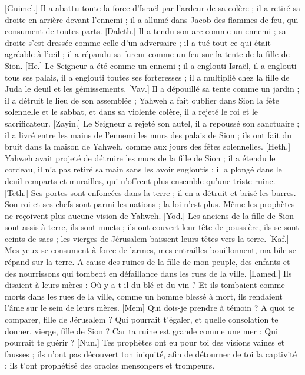 \begin{multicols}{2}
[Guimel.] Il a abattu toute la force d’Israël par l’ardeur de sa colère ; il a retiré sa droite en arrière devant l’ennemi ; il a allumé dans Jacob des flammes de feu, qui consument de toutes parts.
[Daleth.] Il a tendu son arc comme un ennemi ; sa droite s'est dressée comme celle d’un adversaire ; il a tué tout ce qui était agréable à l’œil ; il a répandu sa fureur comme un feu sur la tente de la fille de Sion.
[He.] Le Seigneur a été comme un ennemi ; il a englouti Israël, il a englouti tous ses palais, il a englouti toutes ses forteresses ; il a multiplié chez la fille de Juda le deuil et les gémissements.
[Vav.] Il a dépouillé sa tente comme un jardin ; il a détruit le lieu de son assemblée ; Yahweh a fait oublier dans Sion la fête solennelle et le sabbat, et dans sa violente colère, il a rejeté le roi et le sacrificateur.
[Zayin.] Le Seigneur a rejeté son autel, il a repoussé son sanctuaire ; il a livré entre les mains de l’ennemi les murs des palais de Sion ; ils ont fait du bruit dans la maison de Yahweh, comme aux jours des fêtes solennelles.
[Heth.] Yahweh avait projeté de détruire les murs de la fille de Sion ; il a étendu le cordeau, il n’a pas retiré sa main sans les avoir engloutis ; il a plongé dans le deuil remparts et murailles, qui n'offrent plus ensemble qu'une triste ruine.
[Teth.] Ses portes sont enfoncées dans la terre ; il en a détruit et brisé les barres. Son roi et ses chefs sont parmi les nations ; la loi n’est plus. Même les prophètes ne reçoivent plus aucune vision de Yahweh.
[Yod.] Les anciens de la fille de Sion sont assis à terre, ils sont muets ; ils ont couvert leur tête de poussière, ils se sont ceints de sacs ; les vierges de Jérusalem baissent leurs têtes vers la terre.
[Kaf.] Mes yeux se consument à force de larmes, mes entrailles bouillonnent, ma bile se répand sur la terre. A cause des ruines de la fille de mon peuple, des enfants et des nourrissons qui tombent en défaillance dans les rues de la ville.
[Lamed.] Ils disaient à leurs mères : Où y a-t-il du blé et du vin ? Et ils tombaient comme morts dans les rues de la ville, comme un homme blessé à mort, ils rendaient l'âme sur le sein de leurs mères.
[Mem] Qui dois-je prendre à témoin ? A quoi te comparer, fille de Jérusalem ? Qui pourrait t'égaler, et quelle consolation te donner, vierge, fille de Sion ? Car ta ruine est grande comme une mer : Qui pourrait te guérir ?
[Nun.] Tes prophètes ont eu pour toi des visions vaines et fausses ; ils n’ont pas découvert ton iniquité, afin de détourner de toi la captivité ; ils t’ont prophétisé des oracles mensongers et trompeurs.

\end{multicols}
